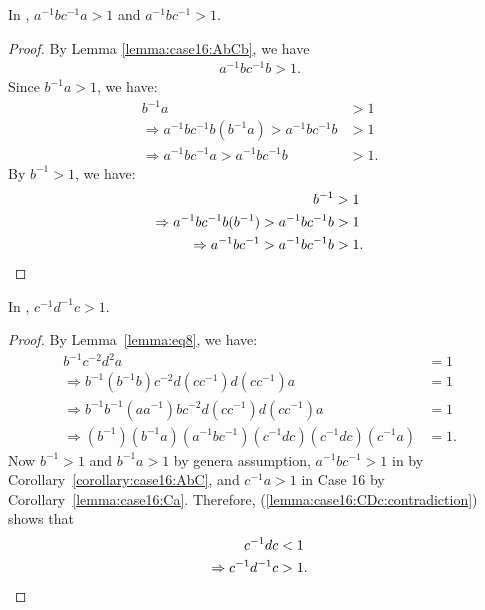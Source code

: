 \begin{corollary} In , $a^{-1}bc^{-1}a>1$ and $a^{-1}bc^{-1}>1$.
\label{corollary:case16:AbC}
\label{corollary:case16:AbCa}
\end{corollary}
\begin{proof}By Lemma \ref{lemma:case16:AbCb}, we have
\begin{align*}
a^{-1}bc^{-1}b>1.
\end{align*}
Since $b^{-1}a>1$, we have:
\begin{align*}
b^{-1}a&>1\\
\Rightarrow{}a^{-1}bc^{-1}b(b^{-1}a)>a^{-1}bc^{-1}b&>1\\
\Rightarrow{}a^{-1}bc^{-1}a>a^{-1}bc^{-1}b&>1.
\end{align*}
By $b^{-1}>1$, we have:
\begin{align*}
b^{-1}&>1\\
\Rightarrow{}a^{-1}bc^{-1}b(b^{-1})>a^{-1}bc^{-1}b&>1\\
\Rightarrow{}a^{-1}bc^{-1}>a^{-1}bc^{-1}b&>1.\qedhere
\end{align*}
\end{proof}

\begin{lemma} In , $c^{-1}d^{-1}c > 1 $.
\label{lemma:case16:CDc}
\end{lemma}
\begin{proof} By Lemma~\ref{lemma:eq8}, we have:
\begin{align}
b^{-1}c^{-2}d^{2}a &= 1\nonumber{}\\
\Rightarrow{}b^{-1}(b^{-1}b)c^{-2}d(cc^{-1})d(cc^{-1})a &= 1\nonumber{}\\
\Rightarrow{}b^{-1}b^{-1}(aa^{-1})bc^{-2}d(cc^{-1})d(cc^{-1})a &= 1\nonumber{}\\
\Rightarrow{}(b^{-1})(b^{-1}a)(a^{-1}bc^{-1})(c^{-1}dc)(c^{-1}dc)(c^{-1}a) &=1.\label{lemma:case16:CDc:contradiction}
\end{align}
Now $b^{-1}>1$ and $b^{-1}a>1$ by genera assumption, $a^{-1}bc^{-1}>1$ in  by Corollary~\ref{corollary:case16:AbC}, and $c^{-1}a>1$ in Case 16 by Corollary~\ref{lemma:case16:Ca}. Therefore, (\ref{lemma:case16:CDc:contradiction}) shows that
\begin{align*}
c^{-1}dc&<1\\
\Rightarrow{}c^{-1}d^{-1}c&>1.\qedhere
\end{align*}
\end{proof}

